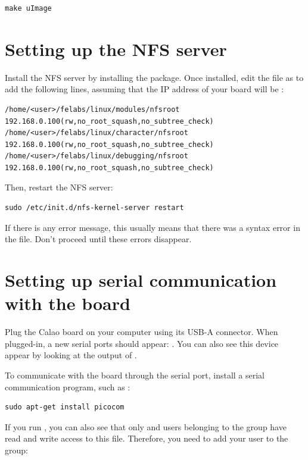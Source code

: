 \begin{verbatim}
make uImage
\end{verbatim}

\section{Setting up the NFS server}

Install the NFS server by installing the 
package. Once installed, edit the  file as
 to add the following lines, assuming that the IP address
of your board will be :

\scriptsize
\begin{verbatim}
/home/<user>/felabs/linux/modules/nfsroot 192.168.0.100(rw,no_root_squash,no_subtree_check)
/home/<user>/felabs/linux/character/nfsroot 192.168.0.100(rw,no_root_squash,no_subtree_check)
/home/<user>/felabs/linux/debugging/nfsroot 192.168.0.100(rw,no_root_squash,no_subtree_check)
\end{verbatim}
\normalsize

Then, restart the NFS server:

\begin{verbatim}
sudo /etc/init.d/nfs-kernel-server restart
\end{verbatim}

If there is any error message, this usually means that there was a
syntax error in the  file. Don't proceed until these
errors disappear.

\section{Setting up serial communication with the board}

Plug the Calao board on your computer using its USB-A connector. When
plugged-in, a new serial ports should appear: .
You can also see this device appear by looking at the output of .

To communicate with the board through the serial port, install a serial communication program, such as :

\begin{verbatim}
sudo apt-get install picocom
\end{verbatim}

If you run , you can also see that only
 and users belonging to the  group have
read and write access to this file. Therefore, you need to add your user
to the  group:

